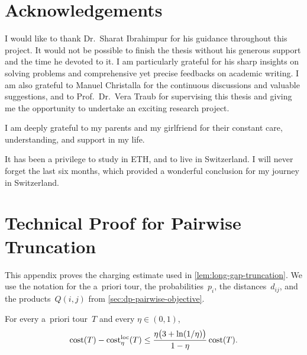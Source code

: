 \documentclass[12pt,a4paper,oneside]{report}
\begin{document}
\chapter*{Acknowledgements}

I would like to thank Dr.\ Sharat Ibrahimpur for his guidance throughout this
project. It would not be possible to finish the thesis without his generous support
and the time he devoted to it. I am particularly grateful for his sharp insights on solving problems and comprehensive 
yet precise feedbacks on academic writing. 
I am also grateful to Manuel Christalla for the
continuous discussions and valuable suggestions, and to Prof.\ Dr.\ Vera Traub for supervising 
this thesis and giving me the opportunity to undertake an exciting research project.

I am  deeply grateful to my parents and my girlfriend for
their constant care, understanding, and support in my life.

It has been a privilege to study in ETH, and to live in Switzerland. I will never forget the last six
months, which provided a wonderful conclusion for my journey in Switzerland.


\appendix
\chapter{Technical Proof for Pairwise Truncation}
\label{app:pairwise-truncation}

This appendix proves the charging estimate used in
\cref{lem:long-gap-truncation}.  We use the notation for the a~priori tour,
the probabilities~$p_i$, the distances~$d_{ij}$, and the products~$Q(i,j)$
from \cref{sec:dp-pairwise-objective}.

\begin{lemma}
\label{lem:discarded-pair-charging}
For every a~priori tour~$T$ and every $\eta\in(0,1)$,
\[
    \operatorname{cost}(T)-\operatorname{cost}^{\operatorname{loc}}_{\eta}(T)
    \le
    \frac{\eta\bigl(3+\ln(1/\eta)\bigr)}{1-\eta}\operatorname{cost}(T).
\]
\end{lemma}
\end{document}
